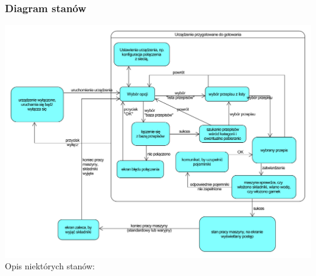 \documentclass[12pt,a4paper,notitlepage]{report}
\begin{document}
\subsubsection{Diagram stanów}
\includegraphics[width=\textwidth,height=\textheight,keepaspectratio=true]{Diagram-stanow-interfejs.pdf}\\
\small
Opis niektórych stanów:
\end{document}
